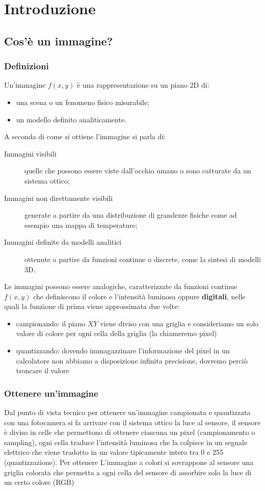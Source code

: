 \chapter{Introduzione}
\section{Cos'è un immagine?}
\subsection{Definizioni}
Un'immagine $f(x,y)$ è una rappresentazione su un piano 2D di:
\begin{itemize}
	\item una scena o un fenomeno fisico misurabile;
	\item un modello definito analiticamente.
\end{itemize}
A seconda di come si ottiene l'immagine si parla di:
\begin{description}
	\item[Immagini visibili] quelle che possono essere viste dall'occhio umano o sono catturate da un sistema ottico;
	\item[Immagini non direttamente visibili] generate a partire da una distribuzione di grandezze fisiche come ad esempio una mappa di temperature;
	\item[Immagini definite da modelli analitici] ottenute a partire da funzioni continue o discrete, come la sintesi di modelli 3D.
\end{description}
Le immagini possono essere analogiche, caratterizzate da funzioni continue $f(x,y)$ che definiscono il colore e l'intensità luminosa oppure \textbf{digitali}, nelle quali la funzione di prima viene approssimata due volte:
\begin{itemize}
	\item campionando: il piano $XY$ viene diviso con una griglia e consideriamo un solo valore di colore per ogni cella della griglia (la chiameremo pixel)
	\item quantizzando: dovendo immagazzinare l'informazione del pixel in un calcolatore non abbiamo a disposizione infinita precisione, dovremo perciò troncare il valore
\end{itemize}
\subsection{Ottenere un'immagine}
Dal punto di vista tecnico per ottenere un'immagine campionata e quantizzata con una fotocamera si fa arrivare con il sistema ottico la luce al sensore, il sensore è diviso in celle che permettono di ottenere ciascuna un pixel (campionamento o sampling), ogni cella traduce l'intensità luminosa che la colpisce in un segnale elettrico che viene tradotto in un valore tipicamente intero tra 0 e 255 (quantizzazione). Per ottenere L'immagine a colori si sovrappone al sensore una griglia colorata che permetta a ogni cella del sensore di assorbire solo la luce di un certo colore (RGB)
